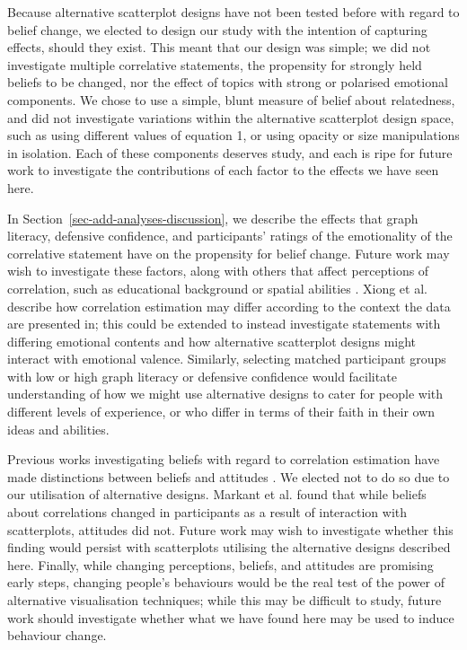 \documentclass[sigconf]{acmart}
\begin{document}
Because alternative scatterplot designs have not been tested before with
regard to belief change, we elected to design our study with the
intention of capturing effects, should they exist. This meant that our
design was simple; we did not investigate multiple correlative
statements, the propensity for strongly held beliefs to be changed, nor
the effect of topics with strong or polarised emotional components. We
chose to use a simple, blunt measure of belief about relatedness, and
did not investigate variations within the alternative scatterplot design
space, such as using different values of equation 1, or using opacity or
size manipulations in isolation. Each of these components deserves
study, and each is ripe for future work to investigate the contributions
of each factor to the effects we have seen here.

In Section~\ref{sec-add-analyses-discussion}, we describe the effects
that graph literacy, defensive confidence, and participants' ratings of
the emotionality of the correlative statement have on the propensity for
belief change. Future work may wish to investigate these factors, along
with others that affect perceptions of correlation, such as educational
background or spatial abilities \citep{tandon_2024}. Xiong et al.
\citep{xiong_2022} describe how correlation estimation may differ
according to the context the data are presented in; this could be
extended to instead investigate statements with differing emotional
contents and how alternative scatterplot designs might interact with
emotional valence. Similarly, selecting matched participant groups with
low or high graph literacy or defensive confidence would facilitate
understanding of how we might use alternative designs to cater for
people with different levels of experience, or who differ in terms of
their faith in their own ideas and abilities.

Previous works investigating beliefs with regard to correlation
estimation have made distinctions between beliefs and attitudes
\citep{xiong_2022, markant_2023}. We elected not to do so due to our
utilisation of alternative designs. Markant et al. \citep{markant_2023}
found that while beliefs about correlations changed in participants as a
result of interaction with scatterplots, attitudes did not. Future work
may wish to investigate whether this finding would persist with
scatterplots utilising the alternative designs described here. Finally,
while changing perceptions, beliefs, and attitudes are promising early
steps, changing people's behaviours would be the real test of the power
of alternative visualisation techniques; while this may be difficult to
study, future work should investigate whether what we have found here
may be used to induce behaviour change.
\end{document}
